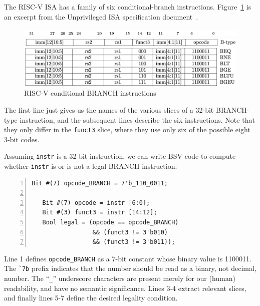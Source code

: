 The RISC-V ISA has a family of six conditional-branch instructions.
Figure~\ref{Fig_Combo_BRANCH_instrs} is an excerpt from the Unprivileged ISA
specification document~\cite{RISCV_Unpriv_2019_12_13}.
\begin{figure}[htbp]
  \centerline{\includegraphics[width=6in,angle=0]{ch040/Figures/Fig_Combo_BRANCH_instrs_1}}
  \centerline{\includegraphics[width=6in,angle=0]{ch040/Figures/Fig_Combo_BRANCH_instrs_2}}
  \vspace{2mm}
  \centerline{\includegraphics[width=6in,angle=0]{ch040/Figures/Fig_Combo_BRANCH_instrs_3}}
  \caption{\label{Fig_Combo_BRANCH_instrs}RISC-V conditional BRANCH instructions}
\end{figure}
The first line just gives us the names of the various slices of a
32-bit BRANCH-type instruction, and the subsequent lines describe the
six instructions.  Note that they only differ in the \verb|funct3|
slice, where they use only six of the possible eight 3-bit codes.

Assuming \verb|instr| is a 32-bit instruction, we can write BSV code
to compute whether \verb|instr| is or is not a legal BRANCH
instruction:

\begin{Verbatim}[frame=single, numbers=left]
   Bit #(7) opcode_BRANCH = 7'b_110_0011;

   Bit #(7) opcode = instr [6:0];
   Bit #(3) funct3 = instr [14:12];
   Bool legal = (opcode == opcode_BRANCH)
                 && (funct3 != 3'b010)
                 && (funct3 != 3'b011));
\end{Verbatim}

Line 1 defines \verb|opcode_BRANCH| as a 7-bit constant whose binary
value is 1100011.  The \verb|`7b| prefix indicates that the number
should be read as a binary, not decimal, number.  The ``\verb|_|''
underscore characters are present merely for our (human) readability,
and have no semantic significance.  Lines 3-4 extract relevant slices,
and finally lines 5-7 define the desired legality condition.

